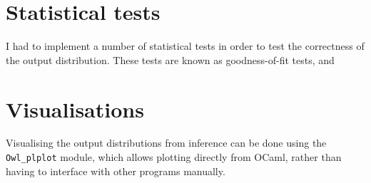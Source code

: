 \section{Statistical tests}
I had to implement a number of statistical tests in order to test the correctness of the output distribution. These tests are known as goodness-of-fit tests, and 

\section{Visualisations}
Visualising the output distributions from inference can be done using the \texttt{Owl\_plplot} module, which allows plotting directly from OCaml, rather than having to interface with other programs manually.